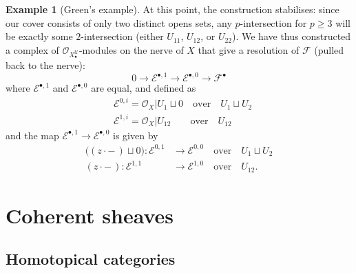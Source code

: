 \documentclass[11pt,fleqn]{article}
\theoremstyle{plain}
\theoremstyle{definition}
\newtheorem{example}[theorem]{Example}
\theoremstyle{remark}
\numberwithin{equation}{theorem}
\newcommand{\cover}{\mathcal{U}}
\newcommand{\OO}{\mathcal{O}}
\newcommand{\restricted}{\mathbin{\big\vert}}
\newcommand{\nerve}[1]{X_{#1}^\cover}
\begin{document}
\begin{example}[Green's example]
            At this point, the construction stabilises: since our cover consists of only two distinct opens sets, any $p$-intersection for $p\geqslant3$ will be exactly some $2$-intersection (either $U_{11}$, $U_{12}$, or $U_{22}$).
            We have thus constructed a complex of $\OO_{\nerve{\bullet}}$-modules on the nerve of $X$ that give a resolution of $\mathscr{F}$ (pulled back to the nerve):
            \begin{equation*}
                0\to\mathcal{E}^{\bullet,1}\to\mathcal{E}^{\bullet,0}\to\mathscr{F}^\bullet
            \end{equation*}
            where $\mathcal{E}^{\bullet,1}$ and $\mathcal{E}^{\bullet,0}$ are equal, and defined as
            \begin{align*}
                &\mathcal{E}^{0,i}=\OO_X\restricted {U_1}\sqcup0 \quad \text{over}\quad U_1\sqcup U_2\\
                &\mathcal{E}^{1,i}=\OO_X\restricted {U_{12}} \qquad \text{over}\quad U_{12}
            \end{align*}
            and the map $\mathcal{E}^{\bullet,1}\to\mathcal{E}^{\bullet,0}$ is given by
            \begin{align*}
                \big((z\cdot-\,)\sqcup0\big) \colon \mathcal{E}^{0,1}&\to\mathcal{E}^{0,0} \quad\text{over}\quad U_1\sqcup U_2\\
                (z\cdot-\,) \colon \mathcal{E}^{1,1}&\to\mathcal{E}^{1,0} \quad\text{over}\quad U_{12}.
            \end{align*}
        \end{example}




\section{Coherent sheaves}\label{section:coherent-sheaves}


    \subsection{Homotopical categories}
\end{document}
